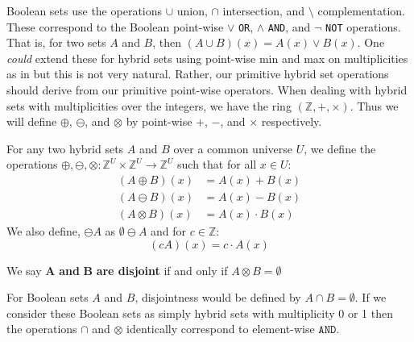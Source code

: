 Boolean sets use the operations $\cup$ union, $\cap$ intersection, and $\setminus$ complementation.
These correspond to the Boolean point-wise $\vee$ \texttt{OR}, $\wedge$ \texttt{AND}, and $\neg$ \texttt{NOT} 
operations. That is, for two sets $A$ and $B$, then $(A \cup B)(x) = A(x) \vee B(x)$.
One \emph{could} extend these for hybrid sets using point-wise min and max on multiplicities as in
\cite{blizard1988, blizard1990, girish2012multiset, singh2011complementation}
but this is not very natural.
Rather, our primitive hybrid set operations should derive from our primitive point-wise operators.
When dealing with hybrid sets with multiplicities over the integers, we have the ring $(\mathbb{Z}, +, \times)$.
Thus we will define $\oplus$, $\ominus$, and $\otimes$ by point-wise $+$, $-$, and $\times$ respectively.


\begin{definition}
	For any two hybrid sets $A$ and $B$ over a common universe $U$, 
	we define the operations $\oplus, \ominus, \otimes : \mathbb{Z}^U \times \mathbb{Z}^U \to \mathbb{Z}^U$ 
	such that for all $x \in U$:
	\begin{align}
		(A \oplus B)(x) 	&= A(x) + B(x) \\
		(A \ominus B)(x) 	&= A(x) - B(x) \\
		(A \otimes B)(x) 	&= A(x) \cdot B(x)
	\end{align}
	We also define, $\ominus A$ as $\emptyset \ominus A$ and for $c \in \mathbb{Z}$:
	\begin{equation}
		(cA)(x) = c \cdot A(x)
	\end{equation}
\end{definition}


\begin{definition}
	We say $\boldsymbol{A}$ \textbf{and} $\boldsymbol{B}$ \textbf{are disjoint} if and only if $A \otimes B = \emptyset$
\end{definition}
For Boolean sets $A$ and $B$, disjointness would be defined by $A \cap B = \emptyset$.
If we consider these Boolean sets as simply hybrid sets with multiplicity 0 or 1 then the operations $\cap$ and $\otimes$
identically correspond to element-wise $\texttt{AND}$.


